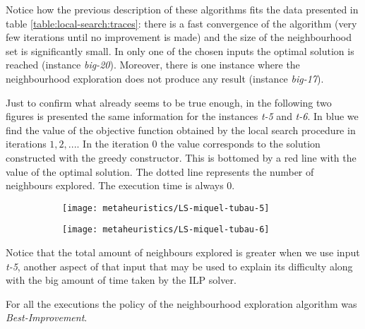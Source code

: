 Notice how the previous description of these algorithms fits the data presented in table
\ref{table:local-search:traces}: there is a fast convergence of the algorithm (very few
iterations until no improvement is made) and the size of the neighbourhood set is significantly
small. In only one of the chosen inputs the optimal solution is reached (instance
\textit{big-20}). Moreover, there is one instance where the neighbourhood exploration does not
produce any result (instance \textit{big-17}).

\hfill

Just to confirm what already seems to be true enough, in the following two figures is presented
the same information for the instances \textit{t-5} and \textit{t-6}. In blue we find the
value of the objective function obtained by the local search procedure in iterations $1,2,...$.
In the iteration 0 the value corresponds to the solution constructed with the greedy
constructor. This is bottomed by a red line with the value of the optimal solution. The
dotted line represents the number of neighbours explored. The execution time is always 0.

\begin{figure}[H]
    \centering
    \begin{subfigure}{0.45\textwidth}
        \centering
        \texttt{[image: metaheuristics/LS-miquel-tubau-5]}
        \label{fig:local-search:traces:t-5}
    \end{subfigure}
    \begin{subfigure}{0.45\textwidth}
        \centering
        \texttt{[image: metaheuristics/LS-miquel-tubau-6]}
        \label{fig:local-search:traces:t-6}
    \end{subfigure}
    \label{fig:local-search:traces}
\end{figure}

Notice that the total amount of neighbours explored is greater when we use input \textit{t-5},
another aspect of that input that may be used to explain its difficulty along with the big
amount of time taken by the ILP solver.

\hfill

For all the executions the policy of the neighbourhood exploration algorithm was 
\textit{Best-Improvement}.

